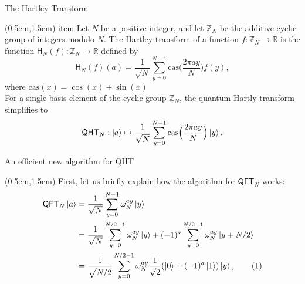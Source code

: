 \documentclass{beamer}
\theoremstyle{definition}
\newcommand\numberthis{\addtocounter{equation}{1}\tag{\theequation}}
\newcommand{\cas}{\mathrm{cas}}
\newcommand{\cht}{\mathsf{H}}
\newcommand{\qht}{\mathsf{QHT}}
\newcommand{\qft}{\mathsf{QFT}}
\begin{document}
\begin{frame}{The Hartley Transform}
    
    \begin{textblock*}{12cm}(0.5cm,1.5cm)
        item Let $N$ be a positive integer, and let $\mathbb{Z}_N$ be the additive cyclic group of integers modulo $N$. The Hartley transform of a function $f: \mathbb{Z}_N \to \mathbb{R}$ is the function $\cht_N(f): \mathbb{Z}_N \to \mathbb{R}$ defined by
        \[ \cht_N(f)(a) = \frac{1}{\sqrt{N}} \sum_{y = 0}^{N - 1} \cas\Big(\frac{2 \pi ay}{N}\Big) f(y),  \]
        where $\cas(x) = \cos(x) + \sin(x)$ \\
        For a single basis element of the cyclic group $\mathbb{Z}_N$, the quantum Hartly transform simplifies to
        \begin{equation}
            \label{eq:qht-N}
            \qht_N: \ket{a} \mapsto \frac{1}{\sqrt{N}} \sum_{y = 0}^{N - 1} \cas\Big(\frac{2\pi a y}{N}\Big) \ket{y}.
        \end{equation}
    \end{textblock*}
    

\end{frame}




\begin{frame}{An efficient new algorithm for QHT}
    
    \begin{textblock*}{12cm}(0.5cm,1.5cm)
        First, let us briefly explain how the algorithm for $\qft_N$ works:
        \begin{align*}
            \qft_N\ket{a}
            & = \frac{1}{\sqrt{N}} \sum_{y = 0}^{N - 1} \omega_N^{ay}\ket{y} \\
            & = \frac{1}{\sqrt{N}} \sum_{y = 0}^{N / 2 - 1} \omega_N^{ay} \ket{y} + (-1)^a \sum_{y = 0}^{N / 2 - 1} \omega_N^{ay} \ket{y + N/2} \\
            & = \frac{1}{\sqrt{N / 2}} \sum_{y = 0}^{N / 2 - 1} \omega_N^{ay} \frac{1}{\sqrt{2}} (\ket{0} + (-1)^a \ket{1}) \ket{y}, \numberthis\label{eq:qft_alt}
        \end{align*}
       
    \end{textblock*}
    

\end{frame}
\end{document}
